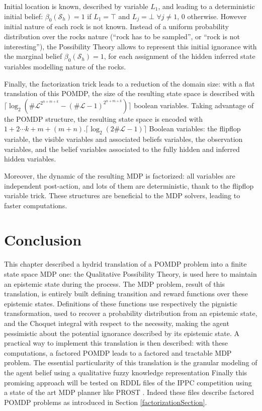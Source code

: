 Initial location is known, described by variable $L_1$, and leading to a deterministic initial belief: 
$\beta_0(\mathcal{S}_h) = 1$ if $L_1=\top$ and $L_j = \bot$ $\forall j \neq 1$, $0$ otherwise. However
initial nature of each rock is not known. Instead of a uniform probability distribution over the
rocks nature (``rock has to be sampled'', or ``rock is not interesting''), the Possibility Theory allows to represent this initial ignorance with the
marginal belief $\beta_0(\mathcal{S}_h) = 1$, for each assignment of the hidden inferred state variables
modelling nature of the rocks. 

Finally, the factorization trick leads to a reduction of the domain size: 
with a flat translation of this POMDP, the size of the resulting state space is described with
$\lceil \log_2( \# \mathcal{L}^{2^{n+m+k}} - (\# \mathcal{L}-1)^{2^{n+m+k}}) \rceil$ boolean variables.
Taking advantage of the POMDP structure, the resulting state space is encoded with 
$1+2 \cdots k+m+(m+n).\lceil \log_2(2 \# \mathcal{L} -1 )  \rceil$ Boolean variables:
the flipflop variable, the visible variables and associated beliefs variables, 
the observation variables, and the belief variables 
associated to the fully hidden and inferred hidden variables.

Moreover, the dynamic of the resulting MDP is factorized: all variables are independent post-action,
and lots of them are deterministic, thank to the flipflop variable trick.
These structures are beneficial to the MDP solvers,
leading to faster computations.

\section{Conclusion}
This chapter described a hydrid translation 
of a POMDP problem into a finite state space MDP one:  
the Qualitative Possibility Theory, 
is used here to maintain an epistemic state during the process. 
The MDP problem, result of this translation, 
is entirely built defining transition and reward functions
over these epistemic states. 
Definitions of these functions use respectively the pignistic transformation,
used to recover a probability distribution 
from an epistemic state, 
and the Choquet integral with respect to the necessity, 
making the agent pessimistic about the potential ignorance 
described by its epistemic state.
A practical way to implement this translation 
is then described: 
with these computations, 
a factored POMDP leads to a factored and tractable MDP problem. 
The essential particularity of this translation 
is the granular modeling of the agent belief 
using a qualitative fuzzy knowledge representation 
Finally this promising approach will be tested on RDDL files 
of the IPPC competition \cite{SannerIPPC1111}
using a state of the art MDP planner like PROST 
\cite{conf/aips/KellerE12}. Indeed these files describe
factored POMDP problems as introduced in Section \ref{factorizationSection}.
